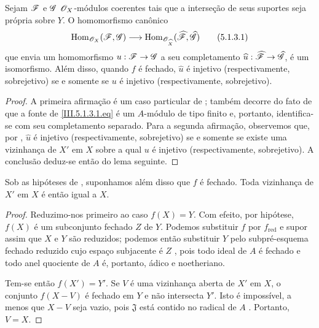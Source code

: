 \begin{corollary}[5.1.3]
\label{III.5.1.3}
Sejam $\mathscr{F}$ e $\mathscr{G}$ $\mathscr{O}_X$-módulos coerentes tais que
a interseção de seus suportes seja própria sobre $Y$. O
homomorfismo canônico
\[
  \Hom_{\sh{O}_X}(\sh{F},\sh{G})
  \longrightarrow
  \Hom_{\sh{O}_{\widehat{X}}}
  (\widehat{\sh{F}},\widehat{\sh{G}})
  \tag{5.1.3.1}
  \label{III.5.1.3.1.eq}
\]
que envia um homomorfismo $u:\sh{F}\to\sh{G}$ a seu completamento
$\widehat{u}:\widehat{\sh{F}}\to\widehat{\sh{G}}$, é um
isomorfismo. Além disso, quando $f$ é fechado,
$\widehat{u}$ é injetivo (respectivamente, sobrejetivo) se e somente
se $u$ é injetivo (respectivamente, sobrejetivo).
\end{corollary}

\begin{proof}
A primeira afirmação é um caso particular de ; também
decorre do fato de que a fonte de \eqref{III.5.1.3.1.eq} é
um $A$-módulo de tipo finito e, portanto, identifica-se com seu
completamento separado. Para a segunda afirmação, observemos que, por
, $\widehat{u}$ é injetivo (respectivamente,
sobrejetivo) se e somente se existe uma vizinhança de $X'$ em
$X$ sobre a qual $u$ é injetivo (respectivamente, sobrejetivo). A
conclusão deduz-se então do lema seguinte.
\end{proof}


\begin{lemma}[5.1.3.1]
\label{III.5.1.3.1}
Sob as hipóteses de , suponhamos além disso que
$f$ é fechado. Toda vizinhança de $X'$ em $X$ é então igual
a $X$.
\end{lemma}

\begin{proof}
Reduzimo-nos primeiro ao caso $f(X)=Y$. Com efeito, por hipótese,
$f(X)$ é um subconjunto fechado $Z$ de $Y$. Podemos substituir $f$ por
$f_{\mathrm{red}}$  e supor assim que $X$
e $Y$ são reduzidos; podemos então substituir $Y$ pelo subpré-esquema
fechado reduzido cujo espaço subjacente é $Z$
, pois todo ideal de $A$ é fechado e todo
anel quociente de $A$ é, portanto, ádico e noetheriano.

Tem-se então $f(X')=Y'$. Se $V$ é uma vizinhança aberta de $X'$
em $X$, o conjunto $f(X-V)$ é fechado em $Y$ e não intersecta $Y'$.
Isto é impossível, a menos que $X-V$ seja vazio, pois $\mathfrak{J}$
está contido no radical de $A$
 . Portanto, $V=X$.
\end{proof}

